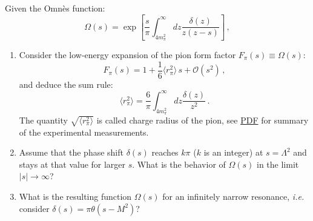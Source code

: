 
Given the Omn\`{e}s function:
\begin{equation}
    \Omega(s)=\exp\left[\frac{s}{\pi}\int_{4m_{\pi}^{2}}^{\infty}dz\frac{\delta(z)}{z(z-s)}\right]\,,
    \label{Eq:Omnes}
\end{equation}

\begin{enumerate}
    \item Consider the low-energy expansion of the pion form factor $F_{\pi}(s)\equiv\Omega(s)$:
          \begin{equation}
              F_{\pi}(s)=1+\frac{1}{6}\langle r^{2}_{\pi}\rangle\,s+\mathcal{O}(s^{2})\,,
          \end{equation}
          and deduce the sum rule:
          \begin{equation}
              \langle r^{2}_{\pi}\rangle=\frac{6}{\pi}\int_{4m_{\pi}^{2}}^{\infty}dz\frac{\delta(z)}{z^{2}}\,.
          \end{equation}
          The quantity $\sqrt{\langle r^{2}_{\pi}\rangle}$ is called charge radius of the pion, see \href{https://pdglive.lbl.gov/DataBlock.action?node=S008CR}{PDF} for summary of the experimental measurements.
    \item Assume that the phase shift $\delta(s)$ reaches $k\pi$ ($k$ is an integer) at $s=\Lambda^{2}$ and stays at that value for larger $s$. What is the behavior of $\Omega(s)$ in the limit $|s|\to\infty$?\\
    \item What is the resulting function $\Omega(s)$ for an infinitely narrow resonance, {\it{i.e.}} consider \mbox{$\delta(s)=\pi\theta(s-M^{2})$}?
\end{enumerate}
